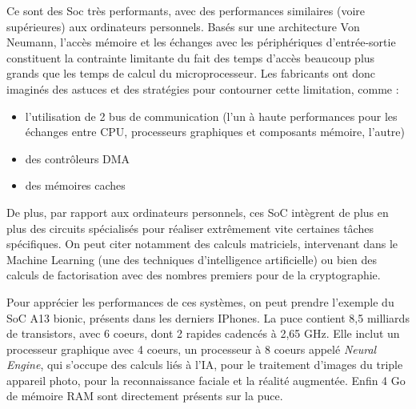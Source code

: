 \documentclass[11pt,a4paper,french,twoside]{PMCours}
\begin{document}
Ce sont des Soc très performants, avec des performances similaires (voire supérieures) aux ordinateurs personnels. Basés sur une architecture Von Neumann, l'accès mémoire et les échanges avec les périphériques d'entrée-sortie constituent la contrainte limitante du fait des temps d'accès beaucoup plus grands que les temps de calcul du microprocesseur. Les fabricants ont donc imaginés des astuces et des stratégies pour contourner cette limitation, comme : 
\begin{itemize}
 \item l'utilisation de 2 bus de communication (l'un à haute performances pour les échanges entre CPU, processeurs graphiques et composants mémoire, l'autre)
 \item des contrôleurs DMA
 \item des mémoires caches
\end{itemize}
De plus, par rapport aux ordinateurs personnels, ces SoC intègrent de plus en plus des circuits spécialisés pour réaliser extrêmement vite certaines tâches spécifiques. On peut citer notamment des calculs matriciels, intervenant dans le Machine Learning (une des techniques d'intelligence artificielle) ou bien des calculs de factorisation avec des nombres premiers pour de la cryptographie.

Pour apprécier les performances de ces systèmes, on peut prendre l'exemple du SoC A13 bionic, présents dans les derniers IPhones. La puce contient 8,5 milliards de transistors, avec 6 coeurs, dont 2 rapides cadencés à 2,65 GHz. Elle inclut un processeur graphique avec 4 coeurs, un processeur à 8 coeurs appelé \emph{Neural Engine}, qui s'occupe des calculs liés à l'IA, pour le traitement d'images du triple appareil photo, pour la reconnaissance faciale et la réalité augmentée. Enfin 4 Go de mémoire RAM sont directement présents sur la puce.
\end{document}
